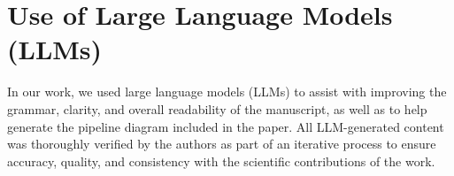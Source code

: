 

\section{Use of Large Language Models (LLMs)}
In our work, we used large language models (LLMs) to assist with improving the grammar, clarity, and overall readability of the manuscript, as well as to help generate the pipeline diagram included in the paper. All LLM-generated content was thoroughly verified by the authors as part of an iterative process to ensure accuracy, quality, and consistency with the scientific contributions of the work.
